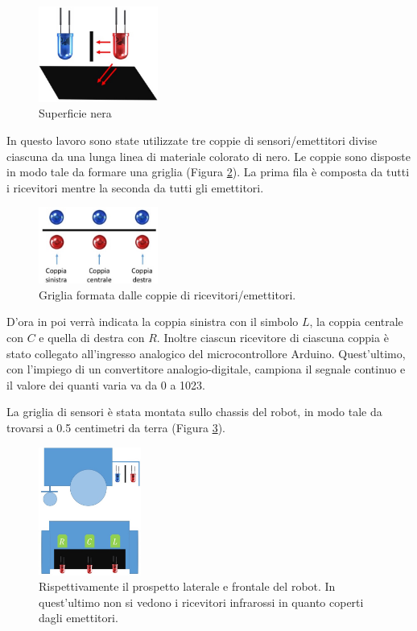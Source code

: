 \documentclass[twoside,twocolumn]{article}
\begin{document}
\begin{figure}[h]
	\centering
	\includegraphics[width=0.35\textwidth]{immagini/leds_absorb2}
	\caption{Superficie nera}
	\label{fig:leds_absorb2}
\end{figure}

In questo lavoro sono state utilizzate tre coppie di sensori/emettitori divise ciascuna da una lunga linea di materiale colorato di nero. Le coppie sono disposte in modo tale da formare una griglia (Figura \ref{fig:configurazione}). La prima fila è composta da tutti i ricevitori mentre la seconda da tutti gli emettitori. 

\begin{figure}[h]
	\centering
	\includegraphics[width=0.35\textwidth]{immagini/configurazione}
	\caption{Griglia formata dalle coppie di ricevitori/emettitori.}
	\label{fig:configurazione}
\end{figure}

D'ora in poi verrà indicata la coppia sinistra con il simbolo $L$, la coppia centrale con $C$ e quella di destra con $R$.
Inoltre ciascun ricevitore di ciascuna coppia è stato collegato all'ingresso analogico del microcontrollore Arduino. Quest'ultimo, con l'impiego di un convertitore analogio-digitale, campiona il segnale continuo e il valore dei quanti varia va da 0 a 1023.

La griglia di sensori è stata montata sullo chassis del robot, in modo tale da trovarsi a 0.5 centimetri da terra (Figura \ref{fig:robot_stilizzato}).   

\begin{figure}[h]
	\centering
	\includegraphics[width=0.3\textwidth]{immagini/robot_stilizzato}
	\caption{Rispettivamente il prospetto laterale e frontale del robot. In quest'ultimo non si vedono i ricevitori infrarossi in quanto coperti dagli emettitori.}
	\label{fig:robot_stilizzato}
\end{figure}
\end{document}
